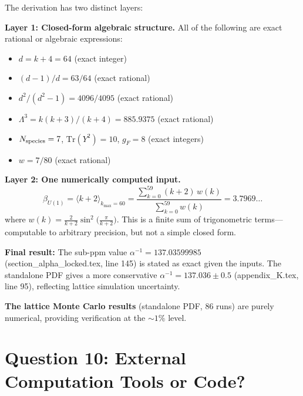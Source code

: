 \documentclass[12pt,a4paper]{article}
\begin{document}
\begin{tcolorbox}[colback=yellow!5!white, colframe=yellow!50!black,
  title=Answer: HYBRID --- closed-form structure with one numerically
  computed input]

The derivation has two distinct layers:

\textbf{Layer 1: Closed-form algebraic structure.}
All of the following are exact rational or algebraic expressions:
\begin{itemize}
\item $d = k + 4 = 64$ (exact integer)
\item $(d-1)/d = 63/64$ (exact rational)
\item $d^2/(d^2-1) = 4096/4095$ (exact rational)
\item $\Lambda^3 = k(k+3)/(k+4) = 885.9375$ (exact rational)
\item $N_{\rm species} = 7$, $\mathrm{Tr}(Y^2) = 10$, $g_F = 8$ (exact integers)
\item $w = 7/80$ (exact rational)
\end{itemize}

\textbf{Layer 2: One numerically computed input.}
\[
\beta_{U(1)} = \langle k+2 \rangle_{k_{\max}=60}
= \frac{\sum_{k=0}^{59}(k+2)\,w(k)}{\sum_{k=0}^{59} w(k)} = 3.7969\ldots
\]
where $w(k) = \frac{2}{k+2}\sin^2\!\bigl(\frac{\pi}{k+2}\bigr)$.
This is a finite sum of trigonometric terms---computable to arbitrary
precision, but not a simple closed form.

\textbf{Final result:}
The sub-ppm value $\alpha^{-1} = 137.03599985$ (section\_alpha\_locked.tex,
line 145) is stated as exact given the inputs.  The standalone PDF gives
a more conservative $\alpha^{-1} = 137.036 \pm 0.5$ (appendix\_K.tex,
line 95), reflecting lattice simulation uncertainty.

\textbf{The lattice Monte Carlo results} (standalone PDF, 86 runs) are
purely numerical, providing verification at the $\sim 1\%$ level.
\end{tcolorbox}

\section{Question 10: External Computation Tools or Code?}
\label{sec:q10}
\end{document}
